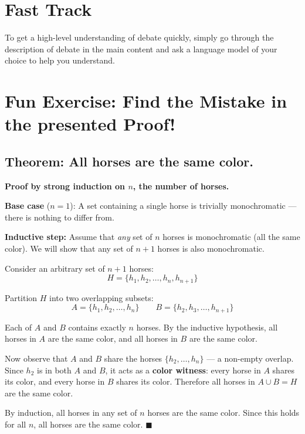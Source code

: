 \documentclass[11pt]{article}
\begin{document}
\section{Fast Track}
\label{sec:fasttrack}

To get a high-level understanding of debate quickly, simply go through the
description of debate in the main content and ask a language model of your
choice to help you understand.

\section{Fun Exercise: Find the Mistake in the presented Proof!}
\label{sec:wrongproofs}

\subsection{Theorem: All horses are the same color.}

\textbf{Proof by strong induction on $n$, the number of horses.}

\textbf{Base case} ($n = 1$): A set containing a single horse is trivially monochromatic --- there is nothing to differ from.

\textbf{Inductive step:} Assume that \textit{any} set of $n$ horses is monochromatic (all the same color). We will show that any set of $n+1$ horses is also monochromatic.

Consider an arbitrary set of $n+1$ horses:
\[
H = \{h_1, h_2, \ldots, h_n, h_{n+1}\}
\]

Partition $H$ into two overlapping subsets:
\[
A = \{h_1, h_2, \ldots, h_n\} \qquad B = \{h_2, h_3, \ldots, h_{n+1}\}
\]

Each of $A$ and $B$ contains exactly $n$ horses. By the inductive hypothesis, all horses in $A$ are the same color, and all horses in $B$ are the same color.

Now observe that $A$ and $B$ share the horses $\{h_2, \ldots, h_n\}$ --- a non-empty overlap. Since $h_2$ is in both $A$ and $B$, it acts as a \textbf{color witness}: every horse in $A$ shares its color, and every horse in $B$ shares its color. Therefore all horses in $A \cup B = H$ are the same color.

By induction, all horses in any set of $n$ horses are the same color. Since this holds for all $n$, all horses are the same color. $\blacksquare$
\end{document}
